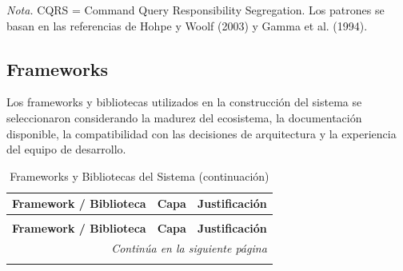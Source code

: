 \textit{Nota.} CQRS = Command Query Responsibility Segregation. Los patrones se basan en las referencias de Hohpe y Woolf (2003) y Gamma et al. (1994).

\subsection{Frameworks}

Los frameworks y bibliotecas utilizados en la construcción del sistema se seleccionaron considerando la madurez del ecosistema, la documentación disponible, la compatibilidad con las decisiones de arquitectura y la experiencia del equipo de desarrollo.

\begin{longtable}{p{3cm} p{2cm} p{9cm}}
\caption{Frameworks y Bibliotecas del Sistema} \\
\toprule
\textbf{Framework / Biblioteca} & \textbf{Capa} & \textbf{Justificación} \\
\midrule
\endfirsthead

\caption[]{Frameworks y Bibliotecas del Sistema (continuación)} \\
\toprule
\textbf{Framework / Biblioteca} & \textbf{Capa} & \textbf{Justificación} \\
\midrule
\endhead

\midrule
\multicolumn{3}{r}{\footnotesize\textit{Continúa en la siguiente página}} \\
\endfoot

\bottomrule
\endlastfoot


\end{longtable}
